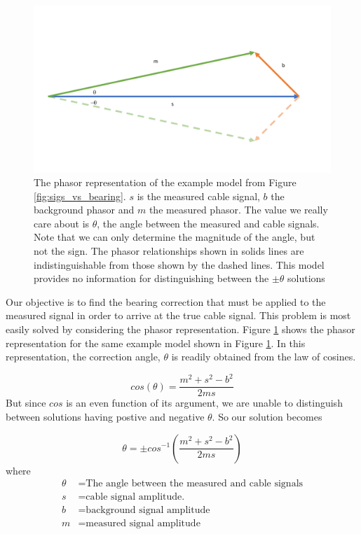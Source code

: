 \documentclass[paper=a4, fontsize=11pt]{scrartcl}
\numberwithin{equation}{section}		%
\numberwithin{figure}{section}			%
\numberwithin{table}{section}				%
\begin{document}
\begin{appendices}
\begin{figure}[h!]
  \caption{
  The phasor representation of the example model from Figure \ref{fig:sigs_vs_bearing}. $s$ is the measured cable signal, $b$ the background phasor and $m$ the measured phasor.  The value we really care about is $\theta$, the angle between the measured and cable signals.  Note that we can only determine the magnitude of the angle, but not the sign.  The phasor relationships shown in solids lines are indistinguishable from those shown by the dashed lines.  This model provides no information for distinguishing between the $\pm\theta$ solutions}
  \label{fig:phasor_base}
  \centering
  \includegraphics[width=1.0\textwidth]{figures/phasor_base.pdf}
\end{figure}

\par Our objective is to find the bearing correction that must be applied to the measured signal in order to arrive at the true cable signal.  This problem is most easily solved by considering the phasor representation.  Figure \ref{fig:phasor_base} shows the phasor representation for the same example model shown in Figure \ref{fig:phasor_base}.  In this representation, the correction angle, $\theta$ is readily obtained from the law of cosines.

\begin{equation} \label{eq:law_of_cos}
cos\left(\theta\right) = \frac{m^2 + s^2 - b^2}{2ms}
\end{equation}
But since $cos$ is an even function of its argument, we are unable to distinguish between solutions having postive and negative $\theta$.  So our solution becomes

\begin{equation} \label{eq:theta_solution}
\theta = \pm cos^{-1}\left(\frac{m^2 + s^2 - b^2}{2ms}\right)
\end{equation}
where
\begin{align*}
        \theta &= \text{The angle between the measured and cable signals}\\
        s &= \text{cable signal amplitude.}\\
        b &= \text{background signal amplitude} \\
        m &= \text{measured signal amplitude} \\
\end{align*}




\end{appendices}
\end{document}
